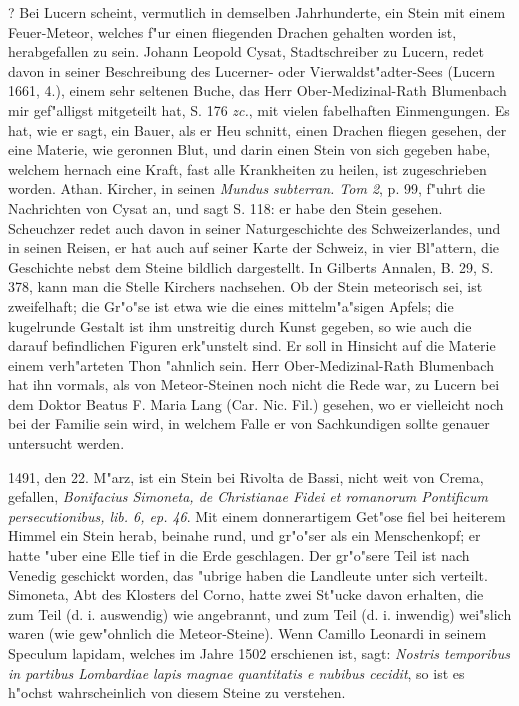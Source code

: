 \documentclass[a4paper, 11pt, oneside, polutonikogreek, german]{article}
\begin{document}
? Bei Lucern scheint, vermutlich in demselben Jahrhunderte, ein Stein mit einem Feuer-Meteor, welches f"ur einen fliegenden Drachen gehalten worden ist, herabgefallen zu sein. Johann Leopold Cysat, Stadtschreiber zu Lucern, redet davon in seiner Beschreibung des Lucerner- oder Vierwaldst"adter-Sees (Lucern 1661, 4.), einem sehr seltenen Buche, das Herr Ober-Medizinal-Rath Blumenbach mir gef"alligst mitgeteilt hat, S. 176 \emph{zc.}, mit vielen fabelhaften Einmengungen. Es hat, wie er sagt, ein Bauer, als er Heu schnitt, einen Drachen fliegen gesehen, der eine Materie, wie geronnen Blut, und darin einen Stein von sich gegeben habe, welchem hernach eine Kraft, fast alle Krankheiten zu heilen, ist zugeschrieben worden. Athan. Kircher, in seinen \emph{Mundus subterran. Tom 2}, p. 99, f"uhrt die Nachrichten von Cysat an, und sagt S. 118: er habe den Stein gesehen. Scheuchzer redet auch davon in seiner Naturgeschichte des Schweizerlandes, und in seinen Reisen, er hat auch auf seiner Karte der Schweiz, in vier Bl"attern, die Geschichte nebst dem Steine bildlich dargestellt. In Gilberts Annalen, B. 29, S. 378, kann man die Stelle Kirchers nachsehen. Ob der Stein meteorisch sei, ist zweifelhaft; die Gr"o"se ist etwa wie die eines mittelm"a"sigen Apfels; die kugelrunde Gestalt ist ihm unstreitig durch Kunst gegeben, so wie auch die darauf befindlichen Figuren erk"unstelt sind. Er soll in Hinsicht auf die Materie einem verh"arteten Thon "ahnlich sein. Herr Ober-Medizinal-Rath Blumenbach hat ihn vormals, als von Meteor-Steinen noch nicht die Rede war, zu Lucern bei dem Doktor Beatus F. Maria Lang (Car. Nic. Fil.) gesehen, wo er vielleicht noch bei der Familie sein wird, in welchem Falle er von Sachkundigen sollte genauer untersucht werden.

1491, den 22. M"arz, ist ein Stein bei Rivolta de Bassi, nicht weit von Crema, gefallen, \emph{Bonifacius Simoneta, de Christianae Fidei et romanorum Pontificum persecutionibus, lib. 6, ep. 46}. Mit einem donnerartigem Get"ose fiel bei heiterem Himmel ein Stein herab, beinahe rund, und gr"o"ser als ein Menschenkopf; er hatte "uber eine Elle tief in die Erde geschlagen. Der gr"o"sere Teil ist nach Venedig geschickt worden, das "ubrige haben die Landleute unter sich verteilt. Simoneta, Abt des Klosters del Corno, hatte zwei St"ucke davon erhalten, die zum Teil (d. i. auswendig) wie angebrannt, und zum Teil (d. i. inwendig) wei"slich waren (wie gew"ohnlich die Meteor-Steine). Wenn Camillo Leonardi in seinem Speculum lapidam, welches im Jahre 1502 erschienen ist, sagt: \emph{Nostris temporibus in partibus Lombardiae lapis magnae quantitatis e nubibus cecidit}, so ist es h"ochst wahrscheinlich von diesem Steine zu verstehen.
\end{document}
